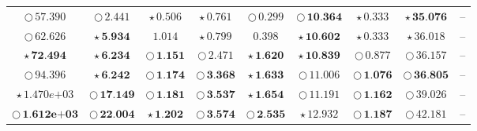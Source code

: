 \documentclass[
]{article}
\begin{document}
\begin{table}[!h]
\begin{tabular}[t]{ccccccccc}
\cellcolor[HTML]{DF536B}$\bigcirc\,\textit{57.390}$ & \cellcolor[HTML]{F5C710}$\bigcirc\,\textit{2.441}$ & \cellcolor[HTML]{F5C710}$\star\,\textit{0.506}$ & \cellcolor[HTML]{2297E6}$\star\,\textit{0.761}$ & \cellcolor[HTML]{DF536B}$\bigcirc\,\textit{0.299}$ & \cellcolor[HTML]{F5C710}$\bigcirc\,\textbf{10.364}$ & \cellcolor[HTML]{DF536B}$\star\,\textit{0.333}$ & \cellcolor[HTML]{F5C710}$\star\,\textbf{35.076}$ & --\\
\cellcolor[HTML]{2297E6}$\bigcirc\,\textit{62.626}$ & \cellcolor[HTML]{F5C710}$\star\,\textbf{5.934}$ & \cellcolor[HTML]{FFFFFF}$1.014$ & \cellcolor[HTML]{DF536B}$\star\,\textit{0.799}$ & \cellcolor[HTML]{FFFFFF}$0.398$ & \cellcolor[HTML]{2297E6}$\star\,\textbf{10.602}$ & \cellcolor[HTML]{2297E6}$\star\,\textit{0.333}$ & \cellcolor[HTML]{F5C710}$\star\,\textit{36.018}$ & --\\
\cellcolor[HTML]{F5C710}$\star\,\textbf{72.494}$ & \cellcolor[HTML]{2297E6}$\star\,\textbf{6.234}$ & \cellcolor[HTML]{DF536B}$\bigcirc\,\textbf{1.151}$ & \cellcolor[HTML]{FFFFFF}$\bigcirc\,2.471$ & \cellcolor[HTML]{2297E6}$\star\,\textbf{1.620}$ & \cellcolor[HTML]{F5C710}$\star\,\textbf{10.839}$ & \cellcolor[HTML]{FFFFFF}$\bigcirc\,0.877$ & \cellcolor[HTML]{F5C710}$\bigcirc\,\textit{36.157}$ & --\\
\cellcolor[HTML]{F5C710}$\bigcirc\,\textit{94.396}$ & \cellcolor[HTML]{DF536B}$\star\,\textbf{6.242}$ & \cellcolor[HTML]{2297E6}$\bigcirc\,\textbf{1.174}$ & \cellcolor[HTML]{2297E6}$\bigcirc\,\textbf{3.368}$ & \cellcolor[HTML]{F5C710}$\star\,\textbf{1.633}$ & \cellcolor[HTML]{2297E6}$\bigcirc\,\textit{11.006}$ & \cellcolor[HTML]{2297E6}$\bigcirc\,\textbf{1.076}$ & \cellcolor[HTML]{2297E6}$\bigcirc\,\textbf{36.805}$ & --\\
\cellcolor[HTML]{F5C710}$\star\,\textit{1.470e+03}$ & \cellcolor[HTML]{DF536B}$\bigcirc\,\textbf{17.149}$ & \cellcolor[HTML]{F5C710}$\bigcirc\,\textbf{1.181}$ & \cellcolor[HTML]{F5C710}$\bigcirc\,\textbf{3.537}$ & \cellcolor[HTML]{DF536B}$\star\,\textbf{1.654}$ & \cellcolor[HTML]{DF536B}$\bigcirc\,\textit{11.191}$ & \cellcolor[HTML]{F5C710}$\bigcirc\,\textbf{1.162}$ & \cellcolor[HTML]{2297E6}$\bigcirc\,\textit{39.026}$ & --\\
\cellcolor[HTML]{DF536B}$\bigcirc\,\textbf{1.612e+03}$ & \cellcolor[HTML]{2297E6}$\bigcirc\,\textbf{22.004}$ & \cellcolor[HTML]{F5C710}$\star\,\textbf{1.202}$ & \cellcolor[HTML]{DF536B}$\bigcirc\,\textbf{3.574}$ & \cellcolor[HTML]{2297E6}$\bigcirc\,\textbf{2.535}$ & \cellcolor[HTML]{F5C710}$\star\,\textit{12.932}$ & \cellcolor[HTML]{DF536B}$\bigcirc\,\textbf{1.187}$ & \cellcolor[HTML]{DF536B}$\bigcirc\,\textit{42.181}$ & --\\

\end{tabular}
\end{table}
\end{document}
